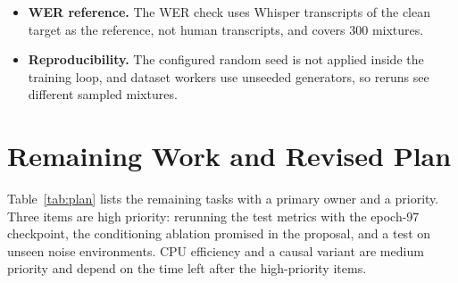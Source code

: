 \documentclass[11pt,a4paper]{article}
\newcommand{\sisdr}{SI-SDR}
\newcommand{\sisdri}{SI-SDRi}
\begin{document}
\begin{itemize}
        \sisdr/STOI/PESQ tables were computed with an earlier checkpoint and must be rerun for the
        final model. The clean scenario distorts the aggregate \sisdri, so non-clean results are
        the headline.
  \item \textbf{WER reference.} The WER check uses Whisper transcripts of the clean target as the
        reference, not human transcripts, and covers 300 mixtures.
  \item \textbf{Reproducibility.} The configured random seed is not applied inside the training
        loop, and dataset workers use unseeded generators, so reruns see different sampled
        mixtures.
\end{itemize}

\section{Remaining Work and Revised Plan}
\label{sec:remaining}

Table~\ref{tab:plan} lists the remaining tasks with a primary owner and a priority. Three items
are high priority: rerunning the test metrics with the epoch-97 checkpoint, the conditioning
ablation promised in the proposal, and a test on unseen noise environments. CPU efficiency and a
causal variant are medium priority and depend on the time left after the high-priority items.
\end{document}
